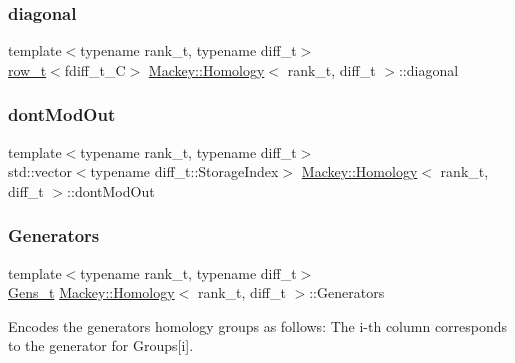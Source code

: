\subsubsection{\texorpdfstring{diagonal}{diagonal}}
{\footnotesize\ttfamily template$<$typename rank\+\_\+t, typename diff\+\_\+t$>$ \\
\hyperlink{namespaceMackey_a6d37801553e585770ca7d1243ab3b213}{row\+\_\+t}$<$fdiff\+\_\+t\+\_\+C$>$ \hyperlink{classMackey_1_1Homology}{Mackey\+::\+Homology}$<$ rank\+\_\+t, diff\+\_\+t $>$\+::diagonal}

\mbox{\label{classMackey_1_1Homology_a12fe9d461d594721ad6985629e3f50f2}} 
\subsubsection{\texorpdfstring{dont\+Mod\+Out}{dontModOut}}
{\footnotesize\ttfamily template$<$typename rank\+\_\+t, typename diff\+\_\+t$>$ \\
std\+::vector$<$typename diff\+\_\+t\+::\+Storage\+Index$>$ \hyperlink{classMackey_1_1Homology}{Mackey\+::\+Homology}$<$ rank\+\_\+t, diff\+\_\+t $>$\+::dont\+Mod\+Out}

\mbox{\label{classMackey_1_1Homology_abceae7827c633cec7a9892826240c9cd}} 
\subsubsection{\texorpdfstring{Generators}{Generators}}
{\footnotesize\ttfamily template$<$typename rank\+\_\+t, typename diff\+\_\+t$>$ \\
\hyperlink{classMackey_1_1Homology_a986c3a6644aa52dc8279a26ade42fd64}{Gens\+\_\+t} \hyperlink{classMackey_1_1Homology}{Mackey\+::\+Homology}$<$ rank\+\_\+t, diff\+\_\+t $>$\+::Generators}



Encodes the generators homology groups as follows\+: The i-\/th column corresponds to the generator for Groups\mbox{[}i\mbox{]}. 

\mbox{\label{classMackey_1_1Homology_aaae78e6463ce6e60e7f4c5861304bc5b}} 

